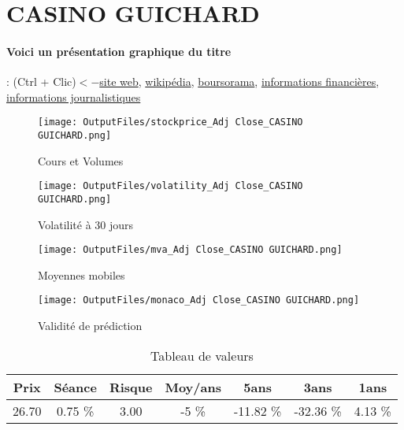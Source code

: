 \documentclass[11pt,a4paper]{report}%
\begin{document}
\newpage

\section{CASINO GUICHARD}

\paragraph{Voici un présentation graphique du titre} : (Ctrl + Clic)$<-$\href{https://www.groupe-casino.fr/investisseurs/outils-investisseurs/}{site web}, \href{https://fr.wikipedia.org/wiki/Groupe_Casino}{wikipédia}, \href{https://www.boursorama.com/cours/1rPCO}{boursorama}, \href{https://www.qwant.com/?q=site:https:%2f%2fwww.easybourse.com%2faction-societe%2fCASINO-GUICHARD&t=web&client=ext-firefox-hp}{informations financières}, \href{https://bourse.lerevenu.com/cours-de-bourse/fiche-valeur-synthese/CASINO-GUICHARD/CO-FR}{informations journalistiques}
\begin{figure}[!htb]
   \begin{minipage}{0.5\textwidth}
     \centering
     \texttt{[image: OutputFiles/stockprice\_Adj Close\_CASINO GUICHARD.png]}
     \caption{Cours et Volumes}\label{Fig:price_CASINO GUICHARD}
   \end{minipage}\hfill
   \begin{minipage}{0.5\textwidth}
     \centering
     \texttt{[image: OutputFiles/volatility\_Adj Close\_CASINO GUICHARD.png]}
     \caption{Volatilité à 30 jours}\label{Fig:volat_CASINO GUICHARD}
   \end{minipage}
\end{figure}
\begin{figure}[!htb]
   \begin{minipage}{0.5\textwidth}
     \centering
     \texttt{[image: OutputFiles/mva\_Adj Close\_CASINO GUICHARD.png]}
     \caption{Moyennes mobiles}\label{Fig:mva_CASINO GUICHARD}
   \end{minipage}\hfill
   \begin{minipage}{0.5\textwidth}
     \centering
     \texttt{[image: OutputFiles/monaco\_Adj Close\_CASINO GUICHARD.png]}
     \caption{Validité de prédiction}\label{Fig:prediction_CASINO GUICHARD}
   \end{minipage}
\end{figure}

\begin{table}[H]
  \centering
    \begin{tabular}{|c|c|c|c|c|c|c|}
    \hline
    Prix & Séance & Risque  & Moy/ans & 5ans & 3ans & 1ans \\
    \hline
    26.70 &    0.75 \%    & 3.00 & -5 \% & -11.82 \% & -32.36 \% & 4.13 \% \\
    \hline
    \end{tabular}%
        \label{tab:table_CASINO GUICHARD}%
      \caption{Tableau de valeurs}
\end{table}%
\end{document}
